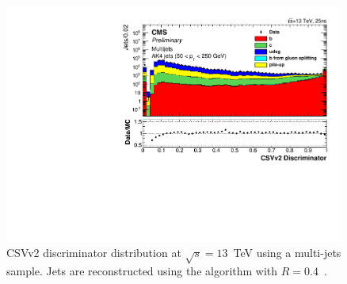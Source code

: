\begin{figure}[ht!]
\begin{center}
    \includegraphics[width=0.99\textwidth]{images/btagCSV.pdf}
    \caption{CSVv2 discriminator distribution at $\sqrt{s}=13$~TeV using a multi-jets sample. Jets are reconstructed using the \antikt algorithm with $R=0.4$~\cite{CMS-PAS-BTV-15-001}.}
    \label{fig:CMSstairway}
\end{center}
\end{figure}

